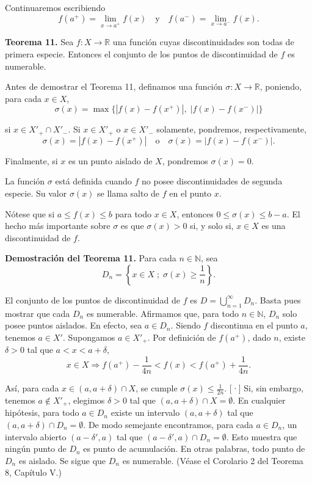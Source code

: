 \documentclass[12pt,oneside]{book}
\begin{document}
Continuaremos escribiendo
\[
f(a^+) = \lim_{x \to a^+} f(x) \quad \text{y} \quad f(a^-) = \lim_{x \to a^-} f(x).
\]

\textbf{Teorema 11.} Sea \(f: X \to \mathbb{R}\) una función cuyas discontinuidades son todas de primera especie. Entonces el conjunto de los puntos de discontinuidad de \(f\) es numerable.

Antes de demostrar el Teorema 11, definamos una función \(\sigma: X \to \mathbb{R}\), poniendo, para cada \(x \in X\),
\[
\sigma(x) = \max\{|f(x) - f(x^+)|, \; |f(x) - f(x^-)|\}
\]

si \(x \in X'_+ \cap X'_-\). Si \(x \in X'_+\) o \(x \in X'_-\) solamente, pondremos, respectivamente,
\[
\sigma(x) = |f(x) - f(x^+)| \quad \text{o} \quad \sigma(x) = |f(x) - f(x^-)|.
\]

Finalmente, si \(x\) es un punto aislado de \(X\), pondremos \(\sigma(x) = 0\).

La función \(\sigma\) está definida cuando \(f\) no posee discontinuidades de segunda especie. Su valor \(\sigma(x)\) se llama salto de \(f\) en el punto \(x\).

Nótese que si \(a \leq f(x) \leq b\) para todo \(x \in X\), entonces \(0 \leq \sigma(x) \leq b - a\). El hecho más importante sobre \(\sigma\) es que \(\sigma(x) > 0\) si, y solo si, \(x \in X\) es una discontinuidad de \(f\).

\textbf{Demostración del Teorema 11.} Para cada \(n \in \mathbb{N}\), sea
\[
D_n = \left\{ x \in X \; ; \; \sigma(x) \geq \frac{1}{n} \right\}.
\]

El conjunto de los puntos de discontinuidad de \(f\) es \(D = \bigcup_{n=1}^\infty D_n\). Basta pues mostrar que cada \(D_n\) es numerable. Afirmamos que, para todo \(n \in \mathbb{N}\), \(D_n\) solo posee puntos aislados. En efecto, sea \(a \in D_n\). Siendo \(f\) discontinua en el punto \(a\), tenemos \(a \in X'\). Supongamos \(a \in X'_+\). Por definición de \(f(a^+)\), dado \(n\), existe \(\delta > 0\) tal que \(a < x < a + \delta\),
\[
x \in X \Rightarrow f(a^+) - \frac{1}{4n} < f(x) < f(a^+) + \frac{1}{4n}.
\]

Así, para cada \(x \in (a, a + \delta) \cap X\), se cumple \(\sigma(x) \leq \frac{1}{2n}\). [·] Si, sin embargo, tenemos \(a \notin X'_+\), elegimos \(\delta > 0\) tal que \((a, a + \delta) \cap X = \emptyset\). En cualquier hipótesis, para todo \(a \in D_n\) existe un intervalo \((a, a + \delta)\) tal que \((a, a + \delta) \cap D_n = \emptyset\). De modo semejante encontramos, para cada \(a \in D_n\), un intervalo abierto \((a - \delta', a)\) tal que \((a - \delta', a) \cap D_n = \emptyset\). Esto muestra que ningún punto de \(D_n\) es punto de acumulación. En otras palabras, todo punto de \(D_n\) es aislado. Se sigue que \(D_n\) es numerable. (Véase el Corolario 2 del Teorema 8, Capítulo V.)
\end{document}
